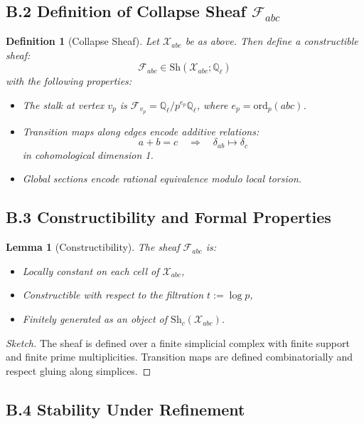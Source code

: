 \documentclass[11pt]{article}
\newtheorem{definition}[theorem]{Definition}
\newtheorem{lemma}[theorem]{Lemma}
\begin{document}
\subsection*{B.2 Definition of Collapse Sheaf \( \mathcal{F}_{abc} \)}

\begin{definition}[Collapse Sheaf]
Let \( \mathcal{X}_{abc} \) be as above. Then define a constructible sheaf:
\[
\mathcal{F}_{abc} \in \mathrm{Sh}(\mathcal{X}_{abc}; \mathbb{Q}_\ell)
\]
with the following properties:
\begin{itemize}
  \item The stalk at vertex \( v_p \) is \( \mathcal{F}_{v_p} = \mathbb{Q}_\ell / p^{e_p} \mathbb{Q}_\ell \), where \( e_p = \mathrm{ord}_p(abc) \).
  \item Transition maps along edges encode additive relations:
  \[
  a + b = c \quad \Rightarrow \quad \delta_{ab} \mapsto \delta_c
  \]
  in cohomological dimension 1.
  \item Global sections encode rational equivalence modulo local torsion.
\end{itemize}
\end{definition}

\subsection*{B.3 Constructibility and Formal Properties}

\begin{lemma}[Constructibility]
The sheaf \( \mathcal{F}_{abc} \) is:
\begin{itemize}
  \item Locally constant on each cell of \( \mathcal{X}_{abc} \),
  \item Constructible with respect to the filtration \( t := \log p \),
  \item Finitely generated as an object of \( \mathrm{Sh}_c(\mathcal{X}_{abc}) \).
\end{itemize}
\end{lemma}

\begin{proof}[Sketch]
The sheaf is defined over a finite simplicial complex with finite support and finite prime multiplicities.  
Transition maps are defined combinatorially and respect gluing along simplices.
\end{proof}

\subsection*{B.4 Stability Under Refinement}
\end{document}
